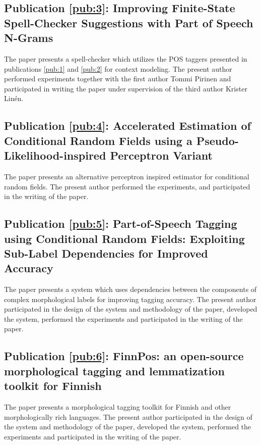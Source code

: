 \subsection*{\bf Publication \ref{pub:3}: Improving Finite-State Spell-Checker Suggestions with Part of Speech N-Grams}
\noindent The paper presents a spell-checker which utilizes the POS
taggers presented in publications \ref{pub:1} and \ref{pub:2} for
context modeling. The present author performed experiments together
with the first author Tommi Pirinen and participated in writing the
paper under supervision of the third author Krister Lin\'{e}n.

\subsection*{\bf Publication \ref{pub:4}: Accelerated Estimation of
  Conditional Random Fields using a Pseudo-Likelihood-inspired
  Perceptron Variant} The paper presents an alternative perceptron
inspired estimator for conditional random fields. The present author
performed the experiments, and participated in the writing of the
paper.

\subsection*{\bf Publication \ref{pub:5}: Part-of-Speech Tagging using
  Conditional Random Fields: Exploiting Sub-Label Dependencies for
  Improved Accuracy} The paper presents a system which uses
dependencies between the components of complex morphological labels
for improving tagging accuracy. The present author participated in the
design of the system and methodology of the paper, developed the
system, performed the experiments and participated in the writing of
the paper.

\subsection*{\bf Publication \ref{pub:6}: FinnPos: an open-source morphological tagging and lemmatization toolkit for Finnish} 
The paper presents a morphological tagging toolkit for Finnish and
other morphologically rich languages. The present author participated
in the design of the system and methodology of the paper, developed
the system, performed the experiments and participated in the writing
of the paper.
